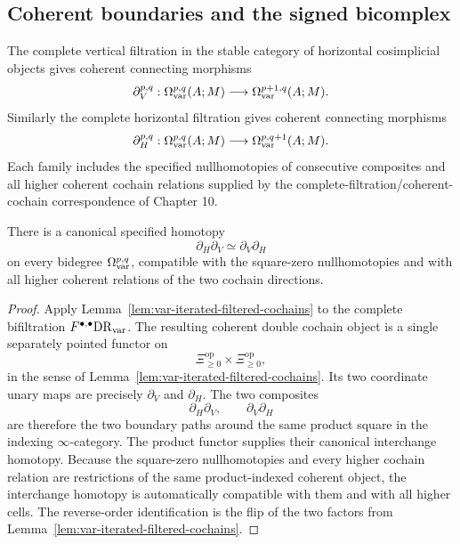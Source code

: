\subsection{Coherent boundaries and the signed bicomplex}

\begin{construction}
\label{con:var-unsigned-boundaries}
The complete vertical filtration in the stable category of horizontal cosimplicial objects gives coherent connecting morphisms
\[
    \partial_V^{p,q}:
    \Omega_{\mathrm{var}}^{p,q}(A;M)
    \longrightarrow
    \Omega_{\mathrm{var}}^{p+1,q}(A;M).
\]
Similarly the complete horizontal filtration gives coherent connecting morphisms
\[
    \partial_H^{p,q}:
    \Omega_{\mathrm{var}}^{p,q}(A;M)
    \longrightarrow
    \Omega_{\mathrm{var}}^{p,q+1}(A;M).
\]
Each family includes the specified nullhomotopies of consecutive composites and all higher coherent cochain relations supplied by the complete-filtration/coherent-cochain correspondence of Chapter 10.
\end{construction}

\begin{proposition}
\label{prop:var-mixed-commutation}
There is a canonical specified homotopy
\[
    \partial_H\partial_V
    \simeq
    \partial_V\partial_H
\]
on every bidegree \(\Omega_{\mathrm{var}}^{p,q}\), compatible with the square-zero nullhomotopies and with all higher coherent relations of the two cochain directions.
\end{proposition}

\begin{proof}
Apply Lemma~\ref{lem:var-iterated-filtered-cochains} to the complete bifiltration \(F^{\bullet,\bullet}\mathrm{DR}_{\mathrm{var}}\). The resulting coherent double cochain object is a single separately pointed functor on
\[
    \Xi_{\ge0}^{\mathrm{op}}
    \times
    \Xi_{\ge0}^{\mathrm{op}},
\]
in the sense of Lemma~\ref{lem:var-iterated-filtered-cochains}.
Its two coordinate unary maps are precisely \(\partial_V\) and \(\partial_H\). The two composites
\[
    \partial_H\partial_V,
    \qquad
    \partial_V\partial_H
\]
are therefore the two boundary paths around the same product square in the indexing \(\infty\)-category. The product functor supplies their canonical interchange homotopy. Because the square-zero nullhomotopies and every higher cochain relation are restrictions of the same product-indexed coherent object, the interchange homotopy is automatically compatible with them and with all higher cells. The reverse-order identification is the flip of the two factors from Lemma~\ref{lem:var-iterated-filtered-cochains}.
\end{proof}

